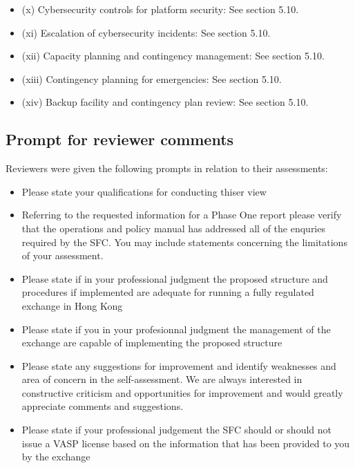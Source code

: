 \documentclass[]{report}
\begin{document}
\begin{itemize}
\begin{itemize}
\item (x) Cybersecurity controls for platform security: See section 5.10.
\item (xi) Escalation of cybersecurity incidents: See section 5.10.
\item (xii) Capacity planning and contingency management: See section 5.10.
\item (xiii) Contingency planning for emergencies: See section 5.10.
\item (xiv) Backup facility and contingency plan review: See section
  5.10.
\end{itemize}
\end{itemize}

\subsection{Prompt for reviewer comments}
Reviewers were given the following prompts in relation to their
assessments:

\begin{itemize}
\item  Please state your qualifications for conducting thiser view

\item Referring to the requested information for a Phase One report
  please verify that the operations and policy manual has addressed
  all of the enquries required by the SFC.  You may include statements
  concerning the limitations of your assessment.

\item Please state if in your professional judgment the proposed
  structure and procedures if implemented are adequate for running a
  fully regulated exchange in Hong Kong

\item Please state if you in your profesionnal judgment the management
  of the exchange are capable of implementing the proposed structure

\item Please state any suggestions for improvement and identify
  weaknesses and area of concern in the self-assessment.  We are
  always interested in constructive criticism and opportunities for
  improvement and would greatly appreciate comments and suggestions.

\item Please state if your professional judgement the SFC should or
  should not issue a VASP license based on the information that has
  been provided to you by the exchange
\end{itemize}
\end{document}
